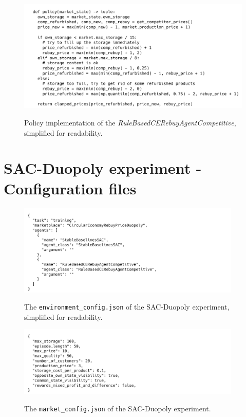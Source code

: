 \begin{figure}[ht]
	\includegraphics[width = \textwidth]{images/policies/RuleBasedCERebuyAgentCompetitivePolicy.png}\\
	\caption{Policy implementation of the \emph{RuleBasedCERebuyAgentCompetitive}, simplified for readability.}\label{fig:PolicyRuleBasedCompetitive}
\end{figure}

\clearpage
\section{SAC-Duopoly experiment - Configuration files}\label{sec:AppendixConfigFiles}

\begin{figure}[ht]
	\includegraphics[width = 0.95\textwidth]{images/configs/SACDuopoly/SACDuopolyEnvironment.png}\\
	\caption{The \texttt{environment\_config.json} of the SAC-Duopoly experiment, simplified for readability.}\label{fig:SACDuopolyConfigEnvironment}
\end{figure}

\begin{figure}[ht]
	\includegraphics[width = 0.95\textwidth]{images/configs/SACDuopoly/SACDuopolyMarket.png}\\
	\caption{The \texttt{market\_config.json} of the SAC-Duopoly experiment.}\label{fig:SACDuopolyConfigMarket}
\end{figure}

